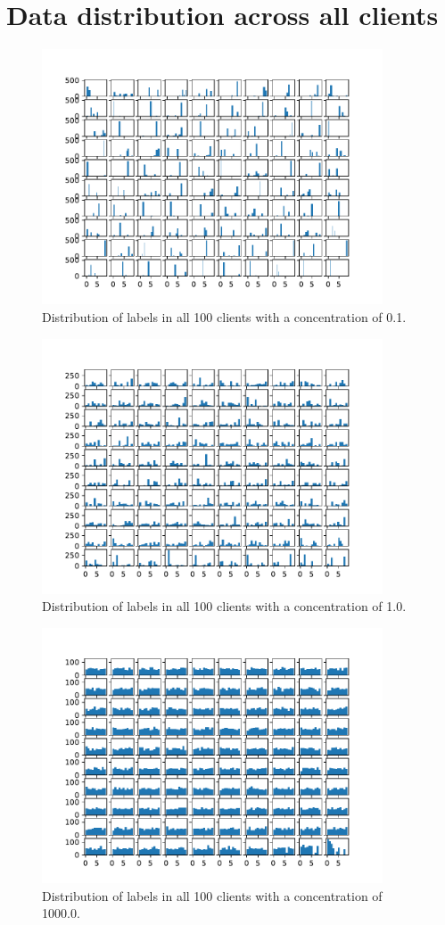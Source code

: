\documentclass{article}
\begin{document}
\section{Data distribution across all clients}
\label{full-data-dist}
\begin{figure}[h]
  \centering
  \includegraphics[width=0.9\textwidth]{images/all_data_dist_0.1.pdf}
  \caption{Distribution of labels in all 100 clients with a concentration of 0.1.}
\end{figure}
\begin{figure}[h]
  \centering
  \includegraphics[width=0.9\textwidth]{images/all_data_dist_1.0.pdf}
  \caption{Distribution of labels in all 100 clients with a concentration of 1.0.}
\end{figure}
\begin{figure}[h]
  \centering
  \includegraphics[width=0.9\textwidth]{images/all_data_dist_1000.0.pdf}
  \caption{Distribution of labels in all 100 clients with a concentration of 1000.0.}
\end{figure}
\end{document}
